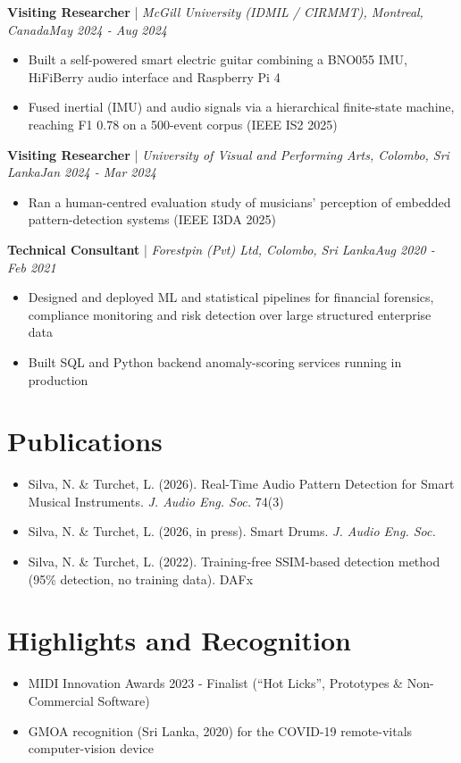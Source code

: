 \documentclass[11pt]{article}
\newenvironment{cvrole}[5]{%
  \par\noindent\textbf{\large #1} | \textit{\small #2, #3}\hfill \textit{\small #4 - #5}\par
  \begin{itemize}[leftmargin=2em, itemsep=-0.3em, topsep=-0.5em]%
}{%
  \end{itemize}\par\noindent\mbox{}\par\vspace{0.1em}%
}
\begin{document}
\begin{cvrole}{Visiting Researcher}{McGill University (IDMIL / CIRMMT)}{Montreal, Canada}{May 2024}{Aug 2024}
    \item Built a self-powered smart electric guitar combining a BNO055 IMU, HiFiBerry audio interface and Raspberry Pi 4
    \item Fused inertial (IMU) and audio signals via a hierarchical finite-state machine, reaching F1 0.78 on a 500-event corpus (IEEE IS2 2025)
\end{cvrole}

\begin{cvrole}{Visiting Researcher}{University of Visual and Performing Arts}{Colombo, Sri Lanka}{Jan 2024}{Mar 2024}
    \item Ran a human-centred evaluation study of musicians' perception of embedded pattern-detection systems (IEEE I3DA 2025)
\end{cvrole}

\begin{cvrole}{Technical Consultant}{Forestpin (Pvt) Ltd}{Colombo, Sri Lanka}{Aug 2020}{Feb 2021}
    \item Designed and deployed ML and statistical pipelines for financial forensics, compliance monitoring and risk detection over large structured enterprise data
    \item Built SQL and Python backend anomaly-scoring services running in production
\end{cvrole}

\section*{Publications}
\begin{itemize}[leftmargin=2em, itemsep=-0.2em, topsep=0.1em]
    \item Silva, N. \& Turchet, L. (2026). Real-Time Audio Pattern Detection for Smart Musical Instruments. \textit{J. Audio Eng. Soc.} 74(3)
    \item Silva, N. \& Turchet, L. (2026, in press). Smart Drums. \textit{J. Audio Eng. Soc.}
    \item Silva, N. \& Turchet, L. (2022). Training-free SSIM-based detection method (95\% detection, no training data). DAFx
\end{itemize}

\enlargethispage{4\baselineskip}
\section*{Highlights and Recognition}
\begin{itemize}[leftmargin=2em, itemsep=-0.2em, topsep=0.1em]
    \item MIDI Innovation Awards 2023 - Finalist (``Hot Licks'', Prototypes \& Non-Commercial Software)
    \item GMOA recognition (Sri Lanka, 2020) for the COVID-19 remote-vitals computer-vision device
\end{itemize}
\end{document}
